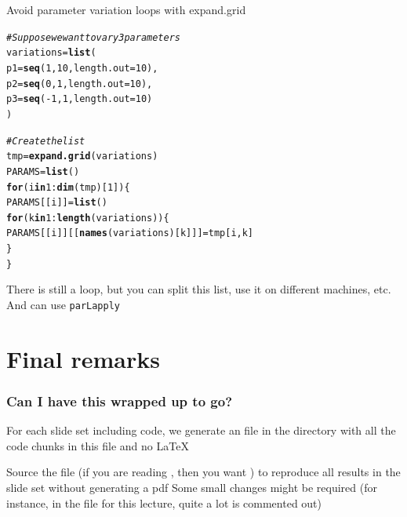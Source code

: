 \documentclass[aspectratio=169]{beamer}\usepackage[]{graphicx}\usepackage[]{xcolor}
\makeatletter
\newcommand{\hlnum}[1]{\textcolor[rgb]{0.686,0.059,0.569}{#1}}%
\newcommand{\hlcom}[1]{\textcolor[rgb]{0.678,0.584,0.686}{\textit{#1}}}%
\newcommand{\hlopt}[1]{\textcolor[rgb]{0,0,0}{#1}}%
\newcommand{\hldef}[1]{\textcolor[rgb]{0.345,0.345,0.345}{#1}}%
\newcommand{\hlkwa}[1]{\textcolor[rgb]{0.161,0.373,0.58}{\textbf{#1}}}%
\newcommand{\hlkwb}[1]{\textcolor[rgb]{0.69,0.353,0.396}{#1}}%
\newcommand{\hlkwc}[1]{\textcolor[rgb]{0.333,0.667,0.333}{#1}}%
\newcommand{\hlkwd}[1]{\textcolor[rgb]{0.737,0.353,0.396}{\textbf{#1}}}%
\newenvironment{kframe}{%
 \def\at@end@of@kframe{}%
 \ifinner\ifhmode%
  \def\at@end@of@kframe{\end{minipage}}%
  \begin{minipage}{\columnwidth}%
 \fi\fi%
 \def\FrameCommand##1{\hskip\@totalleftmargin \hskip-\fboxsep
 \colorbox{shadecolor}{##1}\hskip-\fboxsep
     \hskip-\linewidth \hskip-\@totalleftmargin \hskip\columnwidth}%
 \MakeFramed {\advance\hsize-\width
   \@totalleftmargin\z@ \linewidth\hsize
   \@setminipage}}%
 {\par\unskip\endMakeFramed%
 \at@end@of@kframe}
\newenvironment{knitrout}{}{} %
\makeatother
\begin{document}
\begin{frame}[fragile]{Avoid parameter variation loops with expand.grid}
\begin{knitrout}\footnotesize
{}\color{fgcolor}\begin{kframe}
\begin{alltt}
\hlcom{# Suppose we want to vary 3 parameters}
\hldef{variations} \hlkwb{=} \hlkwd{list}\hldef{(}
    \hlkwc{p1} \hldef{=} \hlkwd{seq}\hldef{(}\hlnum{1}\hldef{,} \hlnum{10}\hldef{,} \hlkwc{length.out} \hldef{=} \hlnum{10}\hldef{),}
    \hlkwc{p2} \hldef{=} \hlkwd{seq}\hldef{(}\hlnum{0}\hldef{,} \hlnum{1}\hldef{,} \hlkwc{length.out} \hldef{=} \hlnum{10}\hldef{),}
    \hlkwc{p3} \hldef{=} \hlkwd{seq}\hldef{(}\hlopt{-}\hlnum{1}\hldef{,} \hlnum{1}\hldef{,} \hlkwc{length.out} \hldef{=} \hlnum{10}\hldef{)}
\hldef{)}

\hlcom{# Create the list}
\hldef{tmp} \hlkwb{=} \hlkwd{expand.grid}\hldef{(variations)}
\hldef{PARAMS} \hlkwb{=} \hlkwd{list}\hldef{()}
\hlkwa{for} \hldef{(i} \hlkwa{in} \hlnum{1}\hlopt{:}\hlkwd{dim}\hldef{(tmp)[}\hlnum{1}\hldef{]) \{}
    \hldef{PARAMS[[i]]} \hlkwb{=} \hlkwd{list}\hldef{()}
    \hlkwa{for} \hldef{(k} \hlkwa{in} \hlnum{1}\hlopt{:}\hlkwd{length}\hldef{(variations)) \{}
        \hldef{PARAMS[[i]][[}\hlkwd{names}\hldef{(variations)[k]]]} \hlkwb{=} \hldef{tmp[i, k]}
    \hldef{\}}
\hldef{\}}
\end{alltt}
\end{kframe}
\end{knitrout}

There is still a loop, but you can split this list, use it on different machines, etc. And can use \texttt{parLapply}
\end{frame}


\section*{Final remarks}
\begin{frame}\frametitle{Can I have this wrapped up to go?}
For each slide set including  code, we generate an  file in the  directory with all the code chunks in this  file and no \LaTeX
\vfill

Source the file (if you are reading , then you want ) to reproduce all results in the slide set without generating a pdf
\vfill
Some small changes might be required (for instance, in the file for this lecture, quite a lot is commented out)
\end{frame}





\end{document}
